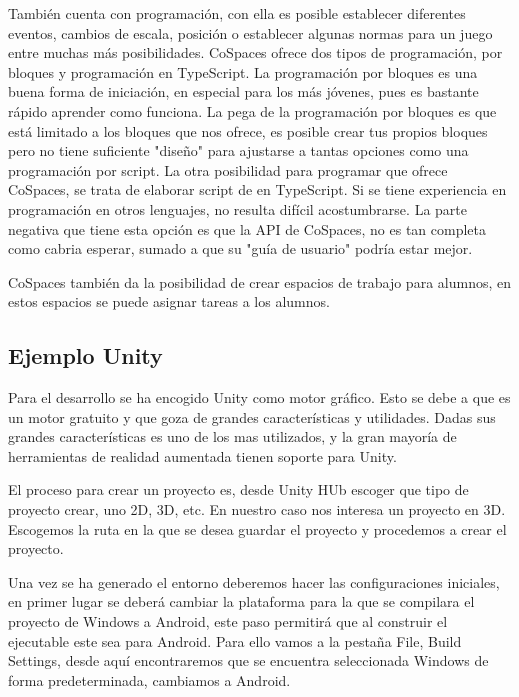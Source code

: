 También cuenta con programación, con ella es posible establecer diferentes eventos, cambios de escala, posición o establecer algunas normas para un juego entre muchas más posibilidades. CoSpaces ofrece dos tipos de programación, por bloques y programación en TypeScript. La programación por bloques es una buena forma de iniciación, en especial para los más jóvenes, pues es bastante rápido aprender como funciona. La pega de la programación por bloques es que está limitado a los bloques que nos ofrece, es posible crear tus propios bloques pero no tiene suficiente "diseño" para ajustarse a tantas opciones como una programación por script. 
La otra posibilidad para programar que ofrece CoSpaces, se trata de elaborar script de en TypeScript. Si se tiene experiencia en programación en otros lenguajes, no resulta difícil acostumbrarse. La parte negativa que tiene esta opción es que la API de CoSpaces, no es tan completa como cabria esperar, sumado a que su "guía de usuario" podría estar mejor.





CoSpaces también da la posibilidad de crear espacios de trabajo para alumnos, en estos espacios se puede asignar tareas a los alumnos.
\subsection{Ejemplo Unity}

Para el desarrollo se ha encogido Unity como motor gráfico. Esto se debe a que es un motor gratuito y que goza de grandes características y utilidades. Dadas sus grandes características es uno de los mas utilizados, y la gran mayoría de herramientas de realidad aumentada tienen soporte para Unity.

El proceso para crear un proyecto es, desde Unity HUb escoger que tipo de proyecto crear, uno 2D, 3D, etc. En nuestro caso nos interesa un proyecto en 3D. Escogemos la ruta en la que se desea guardar el proyecto y procedemos a crear el proyecto.

Una vez se ha generado el entorno deberemos hacer las configuraciones iniciales, en primer lugar se deberá cambiar la plataforma para la que se compilara el proyecto de Windows a Android, este paso permitirá que al construir el ejecutable este sea para Android. Para ello vamos a la pestaña File, Build Settings, desde aquí encontraremos que se encuentra seleccionada Windows de forma predeterminada, cambiamos a Android.

